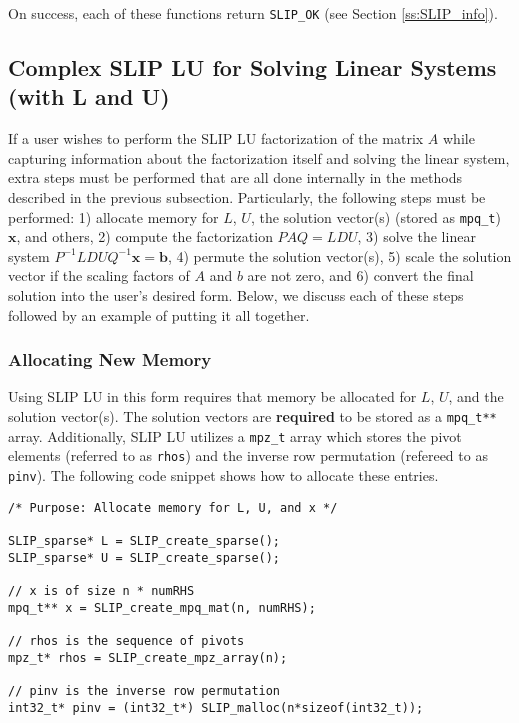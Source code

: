\documentclass[12pt]{article}
\theoremstyle{definition}
\begin{document}
On success, each of these functions return \verb|SLIP_OK| (see Section \ref{ss:SLIP_info}).


\cprotect\subsection{Complex SLIP LU for Solving Linear Systems (with L and U)} \label{s:Using:hard}

If a user wishes to perform the SLIP LU factorization of the matrix $A$ while capturing information about the factorization itself and solving the linear system, extra steps must be performed that are all done internally in the methods described in the previous subsection. Particularly, the following steps must be performed: 1) allocate memory for $L$, $U$, the solution vector(s) (stored as \verb|mpq_t|) $\mathbf{x}$, and others, 2) compute the factorization $PAQ = L D U$, 3) solve the linear system $P^{-1} L D U Q^{-1} \mathbf{x} = \mathbf{b}$, 4) permute the solution vector(s), 5) scale the solution vector if the scaling factors of $A$ and $b$ are not zero, and 6) convert the final solution into the user's desired form. Below, we discuss each of these steps followed by an example of putting it all together.

\subsubsection{Allocating New Memory}

Using SLIP LU in this form requires that memory be allocated for $L$, $U$, and the solution vector(s). The solution vectors are \textbf{required} to be stored as a \verb|mpq_t**| array. Additionally, SLIP LU utilizes a \verb|mpz_t| array which stores the pivot elements (referred to as \verb|rhos|) and the inverse row permutation (refereed to as \verb|pinv|). The following code snippet shows how to allocate these entries.

\begin{verbatim}
/* Purpose: Allocate memory for L, U, and x */

SLIP_sparse* L = SLIP_create_sparse();
SLIP_sparse* U = SLIP_create_sparse();

// x is of size n * numRHS
mpq_t** x = SLIP_create_mpq_mat(n, numRHS);

// rhos is the sequence of pivots
mpz_t* rhos = SLIP_create_mpz_array(n);

// pinv is the inverse row permutation
int32_t* pinv = (int32_t*) SLIP_malloc(n*sizeof(int32_t));

\end{verbatim}
\end{document}
